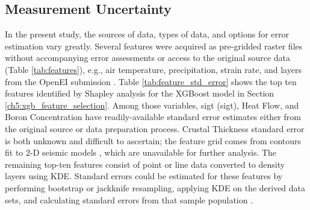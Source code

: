 \subsection{Measurement Uncertainty}\label{ch5:measure_uncertainty}

In the present study, the sources of data, types of data, and options for error estimation vary greatly. Several features were acquired as pre-gridded raster files without accompanying error assessments or access to the original source data (Table \ref{tab:features}), e.g., air temperature, precipitation, strain rate, and layers from the \citeauthor{bielicki_hydrogeolgic_2015} OpenEI submission \citep{kelley_geothermal_2015}. Table \ref{tab:feature_std_error} shows the top ten features identified by Shapley analysis for the XGBoost model in Section \ref{ch5:xgb_feature_selection}. Among those variables, \acrlong{sigt} (\acrshort{sigt}), Heat Flow, and Boron Concentration have readily-available standard error estimates either from the original source or data preparation process. Crustal Thickness standard error is both unknown and difficult to ascertain; the feature grid comes from contours fit to 2-D seismic models \citep{keller_comparative_1991}, which are unavailable for further analysis. The remaining top-ten features consist of point or line data converted to density layers using KDE. Standard errors could be estimated for these features by performing bootstrap or jackknife resampling, applying KDE on the derived data sets, and calculating standard errors from that sample population .

